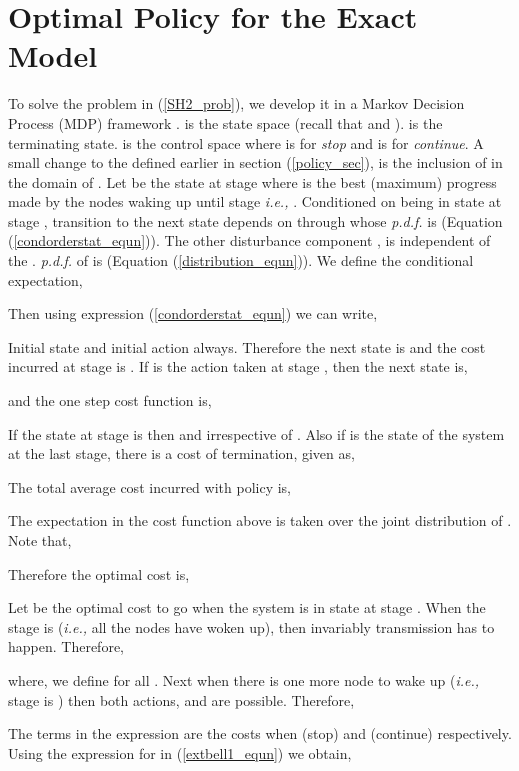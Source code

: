 \documentclass[onecolumn]{IEEEtran}
\begin{document}
\section{Optimal Policy for the Exact Model}
\label{optimal_policy}
To solve the problem in (\ref{SH2_prob}), we develop it in a Markov
Decision Process (MDP) framework \cite{optimalcontrol}.
 is the state space (recall that
 and ).   is the terminating state.
 is the control space where  is for
\emph{stop} and  is for \emph{continue}. A small change to the
 defined earlier in section (\ref{policy_sec}), is the inclusion
of  in the domain of . Let  be the
state at stage  where  is the best (maximum) progress made by
the nodes waking up until stage  \emph{i.e.,}
. Conditioned on being in state
 at stage , transition to the next state depends on
 through  whose \emph{p.d.f.} is 
(Equation (\ref{condorderstat_equn})). The other disturbance component
, is independent of the . \emph{p.d.f.} of  is
 (Equation (\ref{distribution_equn})). We define the
conditional expectation,

\noindent
Then using expression (\ref{condorderstat_equn}) we can write,

\noindent
Initial state  and initial action  always.
Therefore the next state is  and the cost incurred at
stage  is .  If  is the
action taken at stage , then the next state 
is,

and the one step  cost  function is,

If the state at stage  is  then  and
 irrespective of .  Also if  is the state
of the system at the last stage, there is a cost of termination,
 given as,

The total average cost incurred with policy  is, 

The expectation in the cost function above is taken over the joint distribution of . Note that, 
 
 Therefore the optimal cost is,


Let  be the optimal cost to go when the system is in state
 at stage . When the stage is  (\emph{i.e.,}
all the nodes have woken up), then invariably transmission has to
happen. Therefore,

where, we define  for all . Next when there is
one more node to wake up (\emph{i.e.,} stage is ) then both actions,
 and  are possible. Therefore,

The terms in the  expression are the costs when 
(stop) and  (continue) respectively. Using the expression
for  in (\ref{extbell1_equn}) we obtain,
\end{document}
